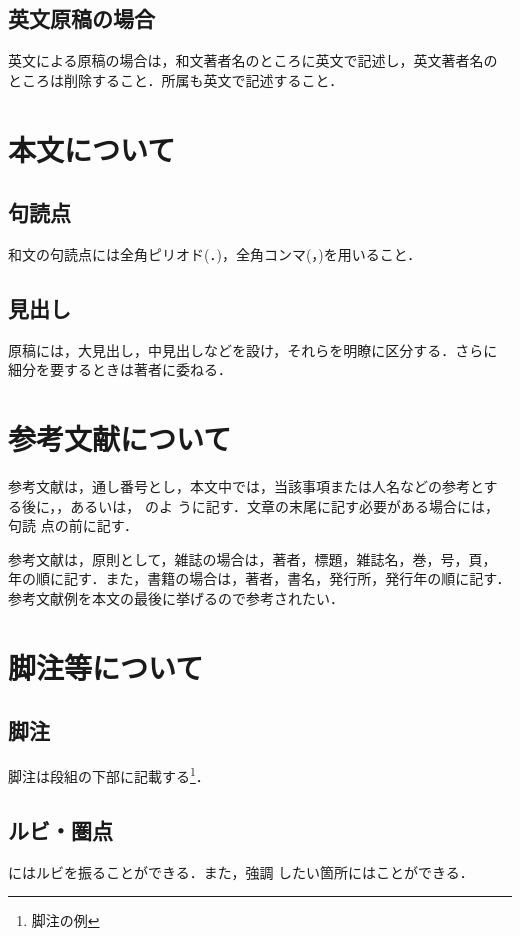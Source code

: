 \documentclass[a4j, 12Q, twocolumn, twoside]{jsarticle}
\begin{document}
\subsection{英文原稿の場合}
英文による原稿の場合は，和文著者名のところに英文で記述し，英文著者名の
ところは削除すること．所属も英文で記述すること．

\section{本文について}

\subsection{句読点}
和文の句読点には全角ピリオド(．)，全角コンマ(，)を用いること．

\subsection{見出し}
原稿には，大見出し，中見出しなどを設け，それらを明瞭に区分する．さらに
細分を要するときは著者に委ねる．

\section{参考文献について}
参考文献は，通し番号とし，本文中では，当該事項または人名などの参考とす
る後に，\cite{okumura}，あるいは，\cite{takeuchi1986new,sutherland2011scrum} のよ
うに記す．文章の末尾に記す必要がある場合には，句読
点の前に記す\cite{IT人材白書2012}．

参考文献は，原則として，雑誌の場合は，著者，標題，雑誌名，巻，号，頁，
年の順に記す．また，書籍の場合は，著者，書名，発行所，発行年の順に記す．
参考文献例を本文の最後に挙げるので参考されたい．

\section{脚注等について}
\subsection{脚注}
脚注は段組の下部に記載する\footnote{脚注の例}．

\subsection{ルビ・圏点}
にはルビを振ることができる．また，強調
したい箇所にはことができる．
\end{document}
